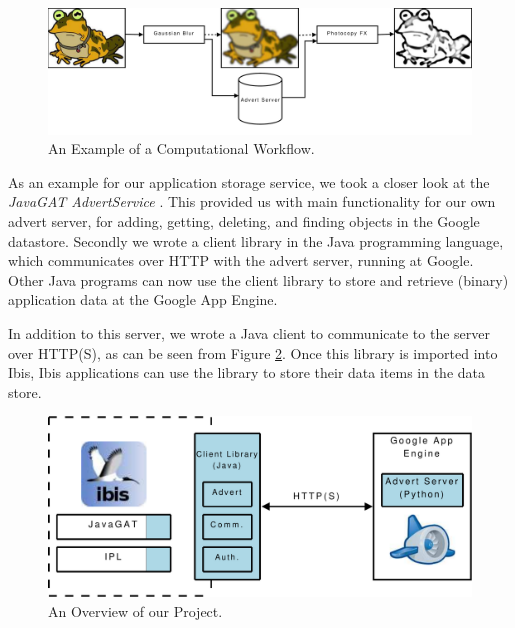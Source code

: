 \begin{figure}[ht] %
\begin{center}
\includegraphics[width=14cm]{./figures/image_workflow.pdf} 
\caption{An Example of a Computational Workflow.\label{img-workflow}}
\end{center}
\end{figure}

As an example for our application storage service, we took a closer look at the
\emph{JavaGAT AdvertService} \cite{javagat-www}. This provided us with main
functionality for our own advert server, for adding, getting, deleting, and
finding objects in the Google datastore. Secondly we wrote a client library in
the Java programming language, which communicates over HTTP with the advert
server, running at Google. Other Java programs can now use the client library to
store and retrieve (binary) application data at the Google App Engine.

In addition to this server, we wrote a Java client to communicate to the server
over HTTP(S), as can be seen from Figure \ref{introduction-overview}. Once this
library is imported into Ibis, Ibis applications can use the library to store
their data items in the data store.

\begin{figure}[ht] %
\begin{center}
\includegraphics[width=14cm]{./figures/project_design.pdf} 
\caption{An Overview of our Project.\label{introduction-overview}}
\end{center}
\end{figure}

